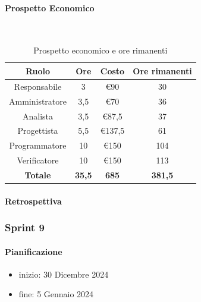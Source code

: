 \documentclass{article}
\begin{document}
                \paragraph{Prospetto Economico}\mbox{}\\
                \begin{table}[H]
                    \centering
                    \begin{tabular}{|c|c|c|c|}
                    \hline
                    \textbf{Ruolo}  & \textbf{Ore}  & \textbf{Costo} & \textbf{Ore rimanenti} \\ \hline
                    Responsabile    & 3             & €90            & 30                     \\ \hline
                    Amministratore  & 3,5           & €70            & 36                   \\ \hline
                    Analista        & 3,5           & €87,5          & 37                   \\ \hline
                    Progettista     & 5,5           & €137,5         & 61                   \\ \hline
                    Programmatore   & 10            & €150           & 104                    \\ \hline
                    Verificatore    & 10            & €150           & 113                    \\ \hline
                    \textbf{Totale} & \textbf{35,5} & \textbf{685}   & \textbf{381,5}         \\ \hline
                    \end{tabular}
                    \caption{Prospetto economico e ore rimanenti}
                \end{table}

                \paragraph{Retrospettiva}
            \subsubsection{Sprint 9}
                \paragraph{Pianificazione}
                \begin{itemize}
                    \item inizio: 30 Dicembre 2024
                    \item fine: 5 Gennaio 2024
                \end{itemize}
\end{document}
